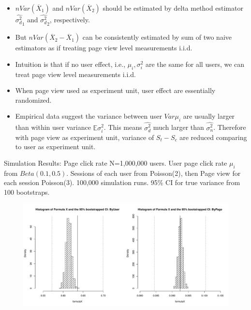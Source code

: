 \documentclass[xcolor=x11names,table]{beamer}
\newcommand{\bbe}{\mathbb{E}}
\newcommand{\wht}{\widehat}
\newcommand{\var}{Var}
\newcommand{\xbar}{\overline{X}}
\newcommand{\naiveest}{\wht{\sigma^2_n}}
\newcommand{\deltaest}{\wht{\sigma^2_d}}
\begin{document}
\begin{frame}
\begin{itemize}
\item  $n\var(\xbar_1)$ and $n\var (\xbar_2)$ should be estimated by delta method estimator $\deltaest_1$ and $\deltaest_2$, respectively.
\item But $n\var(\xbar_2-\xbar_1)$ can be consistently estimated by sum of two naive estimators as if treating page view level measurements i.i.d. 
\item Intuition is that if no user effect, i.e., $\mu_i,\sigma_i^2$ are the same for all users, we can treat page view level measurements i.i.d.
\item When page view used as experiment unit, user effect are essentially randomized. 
\item Empirical data suggest the variance between user $\var \mu_i$ are usually larger than within user variance $\bbe \sigma_i^2$. This means $\deltaest$ much larger than $\naiveest$. Therefore with page view as experiment unit, variance of $S_t-S_c$ are reduced comparing to user as experiment unit.
\end{itemize}
\end{frame}


\begin{frame}{Simulation Results: Page click rate}
N=1,000,000 users. User page click rate $\mu_i$ from $Beta(0.1,0.5)$. Sessions of each user from Poisson(2), then Page view for each session Poisson(3).  100,000 simulation runs. 95\% CI for true variance from 100 bootstraps. 
\begin{figure}[!htbp]
  \centering
  \includegraphics[width=1\textwidth]{jsm}
\end{figure}
\end{frame}
\end{document}
